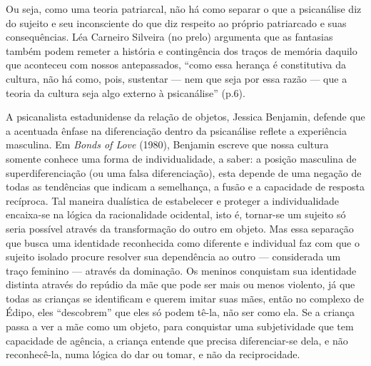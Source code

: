 Ou seja, como uma teoria patriarcal, não há como separar o que a
psicanálise diz do sujeito e seu inconsciente do que diz respeito ao
próprio patriarcado e suas consequências. Léa Carneiro Silveira (no
prelo) argumenta que as fantasias também podem remeter a história e
contingência dos traços de memória daquilo que aconteceu com nossos
antepassados, ``como essa herança é constitutiva da cultura, não há como,
pois, sustentar --- nem que seja por essa razão --- que a teoria da
cultura seja algo externo à psicanálise'' (p.6).

A psicanalista estadunidense da relação de objetos, Jessica Benjamin,
defende que a acentuada ênfase na diferenciação dentro da psicanálise
reflete a experiência masculina. Em \emph{Bonds of Love} (1980),
Benjamin escreve que nossa cultura somente conhece uma forma de
individualidade, a saber: a posição masculina de superdiferenciação (ou
uma falsa diferenciação), esta depende de uma negação de todas as
tendências que indicam a semelhança, a fusão e a capacidade de resposta
recíproca. Tal maneira dualística de estabelecer e proteger a
individualidade encaixa-se na lógica da racionalidade ocidental, isto é,
tornar-se um sujeito só seria possível através da transformação do outro
em objeto. Mas essa separação que busca uma identidade reconhecida como
diferente e individual faz com que o sujeito isolado procure resolver
sua dependência ao outro --- considerada um traço feminino --- através
da dominação. Os meninos conquistam sua identidade distinta através do
repúdio da mãe que pode ser mais ou menos violento, já que todas as
crianças se identificam e querem imitar suas mães, então no complexo de
Édipo, eles ``descobrem'' que eles só podem tê-la, não ser como ela. Se
a criança passa a ver a mãe como um objeto, para conquistar uma
subjetividade que tem capacidade de agência, a criança entende que
precisa diferenciar-se dela, e não reconhecê-la, numa lógica do dar ou
tomar, e não da reciprocidade.

